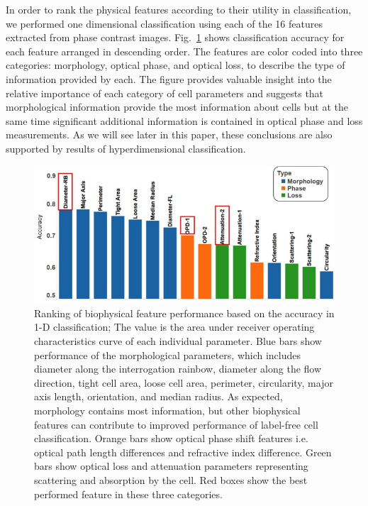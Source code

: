 \documentclass[aps,pra,reprint,superscriptaddress]{revtex4-1}
\begin{document}
In order to rank the physical features according to their utility in classification, we performed one dimensional classification using each of the 16 features extracted from phase contrast images. Fig.~\ref{fig:FeaturesRank} shows classification accuracy for each feature arranged in descending order. The features are color coded into three categories: morphology, optical phase, and optical loss, to describe the type of information provided by each. The figure provides valuable insight into the relative importance of each category of cell parameters and suggests that morphological information provide the most information about cells but at the same time significant additional information is contained in optical phase and loss measurements. As we will see later in this paper, these conclusions are also supported by results of hyperdimensional classification.

\begin{figure}
\includegraphics[scale=0.55]{FigureFeaturesRank.jpg}
\caption{\label{fig:FeaturesRank} Ranking of biophysical feature performance based on the accuracy in 1-D classification; The value is the area under receiver operating characteristics curve of each individual parameter. Blue bars show performance of the morphological parameters, which includes diameter along the interrogation rainbow, diameter along the flow direction, tight cell area, loose cell area, perimeter, circularity, major axis length, orientation, and median radius. As expected, morphology contains most information, but other biophysical features can contribute to improved performance of label-free cell classification. Orange bars show optical phase shift features i.e. optical path length differences and refractive index difference. Green bars show optical loss and attenuation parameters representing scattering and absorption by the cell. Red boxes show the best performed feature in these three categories.}
\end{figure}
\end{document}
